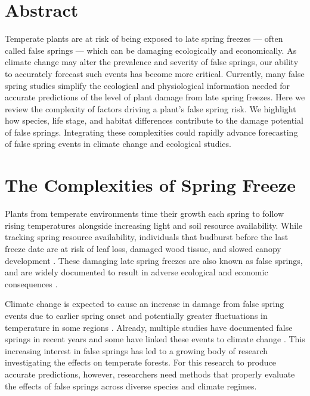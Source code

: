 \documentclass{article}\usepackage[]{graphicx}\usepackage[]{color}
\begin{document}
\section*{Abstract}
Temperate plants are at risk of being exposed to late spring freezes --- often called false springs --- which can be damaging ecologically and economically. As climate change may alter the prevalence and severity of false springs, our ability to accurately forecast such events has become more critical. Currently, many false spring studies simplify the ecological and physiological information needed for accurate predictions of the level of plant damage from late spring freezes. Here we review the complexity of factors driving a plant's false spring risk. We highlight how species, life stage, and habitat differences contribute to the damage potential of false springs. %
Integrating these complexities could rapidly advance forecasting of false spring events in climate change and ecological studies.

\section*{The Complexities of Spring Freeze}

Plants from temperate environments time their growth each spring to follow rising temperatures alongside increasing light and soil resource availability. While tracking spring resource availability, individuals that budburst before the last freeze date are at risk of leaf loss, damaged wood tissue, and slowed canopy development \citep{Gu2008, Hufkens2012}. These damaging late spring freezes are also known as false springs, and are widely documented to result in adverse ecological and economic consequences \citep{Knudson2012, Ault2013}.

Climate change is expected to cause an increase in damage from false spring events due to earlier spring onset and potentially greater fluctuations in temperature in some regions \citep{Inouye2008, Martin2010}. Already, multiple studies have documented false springs in recent years \citep{Gu2008, Augspurger2009, Augspurger2013, Menzel2015} and some have linked these events to climate change \citep{Ault2013, Allstadt2015, Muffler2016, Xin2016, Vitra2017}. This increasing interest in false springs has led to a growing body of research investigating the effects on temperate forests. For this research to produce accurate predictions, however, researchers need methods that properly evaluate the effects of false springs across diverse species and climate regimes. 
\end{document}
